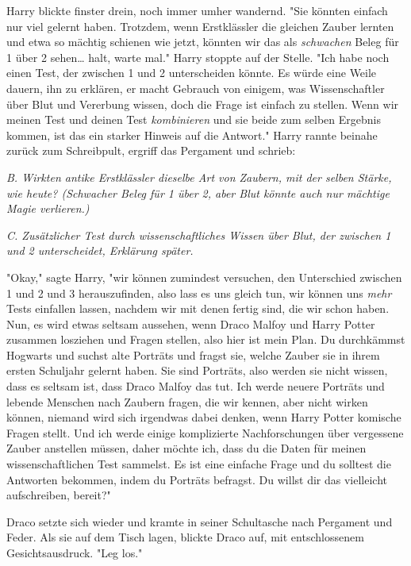 {Harry blickte finster drein, noch immer umher wandernd. "Sie könnten einfach nur viel gelernt haben. Trotzdem, wenn Erstklässler die gleichen Zauber lernten und etwa so mächtig schienen wie jetzt, könnten wir das als \emph{schwachen} Beleg für 1 über 2 sehen… halt, warte mal." Harry stoppte auf der Stelle. "Ich habe noch einen Test, der zwischen 1 und 2 unterscheiden könnte. Es würde eine Weile dauern, ihn zu erklären, er macht Gebrauch von einigem, was Wissenschaftler über Blut und Vererbung wissen, doch die Frage ist einfach zu stellen. Wenn wir meinen Test und deinen Test \emph{kombinieren} und sie beide zum selben Ergebnis kommen, ist das ein starker Hinweis auf die Antwort." Harry rannte beinahe zurück zum Schreibpult, ergriff das Pergament und schrieb:

\emph{B. Wirkten antike Erstklässler dieselbe Art von Zaubern, mit der selben Stärke, wie heute? (Schwacher Beleg für 1 über 2, aber Blut könnte auch nur mächtige Magie verlieren.)}

\emph{C. Zusätzlicher Test durch wissenschaftliches Wissen über Blut, der zwischen 1 und 2 unterscheidet, Erklärung später.}

"Okay," sagte Harry, "wir können zumindest versuchen, den Unterschied zwischen 1 und 2 und 3 herauszufinden, also lass es uns gleich tun, wir können uns \emph{mehr} Tests einfallen lassen, nachdem wir mit denen fertig sind, die wir schon haben. Nun, es wird etwas seltsam aussehen, wenn Draco Malfoy und Harry Potter zusammen losziehen und Fragen stellen, also hier ist mein Plan. Du durchkämmst Hogwarts und suchst alte Porträts und fragst sie, welche Zauber sie in ihrem ersten Schuljahr gelernt haben. Sie sind Porträts, also werden sie nicht wissen, dass es seltsam ist, dass Draco Malfoy das tut. Ich werde neuere Porträts und lebende Menschen nach Zaubern fragen, die wir kennen, aber nicht wirken können, niemand wird sich irgendwas dabei denken, wenn Harry Potter komische Fragen stellt. Und ich werde einige komplizierte Nachforschungen über vergessene Zauber anstellen müssen, daher möchte ich, dass du die Daten für meinen wissenschaftlichen Test sammelst. Es ist eine einfache Frage und du solltest die Antworten bekommen, indem du Porträts befragst. Du willst dir das vielleicht aufschreiben, bereit?"

Draco setzte sich wieder und kramte in seiner Schultasche nach Pergament und Feder. Als sie auf dem Tisch lagen, blickte Draco auf, mit entschlossenem Gesichtsausdruck. "Leg los."

}
